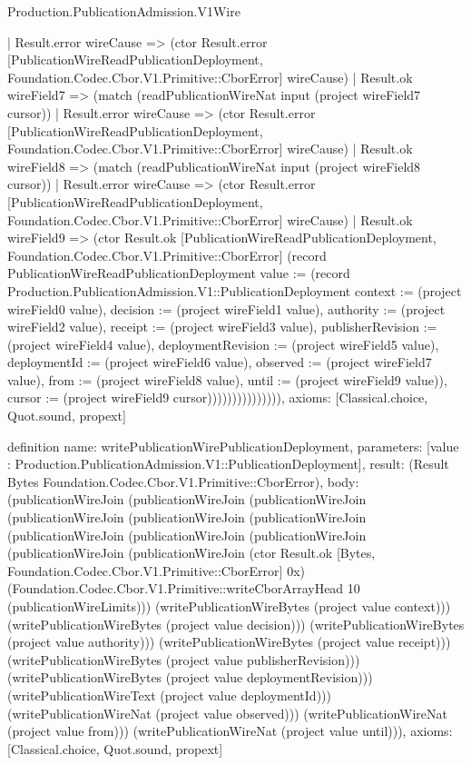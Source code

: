 \begin{lexlean}{Production.PublicationAdmission.V1Wire}
\begin{semanticmodule}
{                      | Result.error wireCause => (ctor Result.error [PublicationWireReadPublicationDeployment, Foundation.Codec.Cbor.V1.Primitive::CborError] wireCause)
                      | Result.ok wireField7 => (match (readPublicationWireNat input (project wireField7 cursor))
                        | Result.error wireCause => (ctor Result.error [PublicationWireReadPublicationDeployment, Foundation.Codec.Cbor.V1.Primitive::CborError] wireCause)
                        | Result.ok wireField8 => (match (readPublicationWireNat input (project wireField8 cursor))
                          | Result.error wireCause => (ctor Result.error [PublicationWireReadPublicationDeployment, Foundation.Codec.Cbor.V1.Primitive::CborError] wireCause)
                          | Result.ok wireField9 => (ctor Result.ok [PublicationWireReadPublicationDeployment, Foundation.Codec.Cbor.V1.Primitive::CborError] (record PublicationWireReadPublicationDeployment {value := (record Production.PublicationAdmission.V1::PublicationDeployment {context := (project wireField0 value), decision := (project wireField1 value), authority := (project wireField2 value), receipt := (project wireField3 value), publisherRevision := (project wireField4 value), deploymentRevision := (project wireField5 value), deploymentId := (project wireField6 value), observed := (project wireField7 value), from := (project wireField8 value), until := (project wireField9 value)}), cursor := (project wireField9 cursor)})))))))))))))),
  axioms: [Classical.choice, Quot.sound, propext]
}

definition{
  name: writePublicationWirePublicationDeployment,
  parameters: [value : Production.PublicationAdmission.V1::PublicationDeployment],
  result: (Result Bytes Foundation.Codec.Cbor.V1.Primitive::CborError),
  body: (publicationWireJoin (publicationWireJoin (publicationWireJoin (publicationWireJoin (publicationWireJoin (publicationWireJoin (publicationWireJoin (publicationWireJoin (publicationWireJoin (publicationWireJoin (publicationWireJoin (ctor Result.ok [Bytes, Foundation.Codec.Cbor.V1.Primitive::CborError] 0x) (Foundation.Codec.Cbor.V1.Primitive::writeCborArrayHead 10 (publicationWireLimits))) (writePublicationWireBytes (project value context))) (writePublicationWireBytes (project value decision))) (writePublicationWireBytes (project value authority))) (writePublicationWireBytes (project value receipt))) (writePublicationWireBytes (project value publisherRevision))) (writePublicationWireBytes (project value deploymentRevision))) (writePublicationWireText (project value deploymentId))) (writePublicationWireNat (project value observed))) (writePublicationWireNat (project value from))) (writePublicationWireNat (project value until))),
  axioms: [Classical.choice, Quot.sound, propext]
}


\end{semanticmodule}
\end{lexlean}
